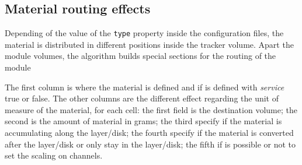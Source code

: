 \documentclass[12pt, a4paper]{article}
\newcommand{\prop}[1]{\texttt{#1}}
\begin{document}
\subsection{Material routing effects}
Depending of the value of the \prop{type} property inside the
configuration files, the material is distributed in different
positions inside the tracker volume. Apart the module volumes, the
algorithm builds special sections for the routing of the module

The first column is where the material is defined and if is defined
with \emph{service} true or false. The other columns are the different
effect regarding the unit of measure of the material, for each cell:
the first field is the destination volume; the second is the amount of
material in grams; the third specify if the material is accumulating
along the layer/disk; the fourth specify if the material is converted
after the layer/disk or only stay in the layer/disk; the fifth if is
possible or not to set the scaling on channels.
\end{document}
